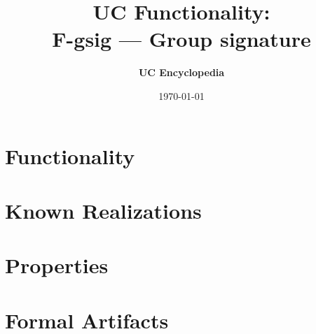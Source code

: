 \documentclass[11pt,a4paper]{article}
\title{\textbf{\Large UC Functionality:}\\[0.2em] \Large F-gsig --- Group signature}
\author{\textbf{UC Encyclopedia}}
\date{\today}
\newtheorem{functionality}{Functionality}
\begin{document}
\maketitle

\begin{abstract}
\end{abstract}

\section{Functionality}

%

\section{Known Realizations}


\section{Properties}


\section{Formal Artifacts}

\end{document}
